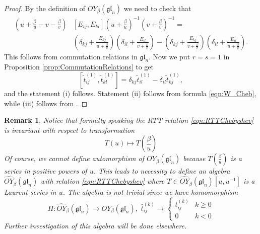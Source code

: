 \documentclass[10pt]{article}%
\numberwithin{equation}{section}
\newtheorem{rem}[thm]{Remark}
\newcommand{\gl}{{\mathfrak{gl}}}
\begin{document}
\begin{proof}
By the definition of $OY_{\beta}(\gl_n)$ we need to check that
    \[
\begin{aligned}
    \left(u+\frac{\beta}{u}-v-\frac{\beta}{v}\right)&[E_{ij},E_{kl}](u+\frac{\beta}{u})^{-1}(v+\frac{\beta}{v})^{-1}=\\
    &(\delta_{kj}+ \frac{E_{kj}}{u+\frac{\beta}{u}})(\delta_{il}+ \frac{E_{il}}{v+\frac{\beta}{v}})-(\delta_{kj}+ \frac{E_{kj}}{v+\frac{\beta}{v}})(\delta_{il}+ \frac{E_{il}}{u+\frac{\beta}{u}}).
\end{aligned}
\]
This follows from commutation relations in $\gl_n$. Now we put $r=s=1$  in Proposition \ref{prop:CommutationRelations} to get
\[
[\tilde{t}_{ij}^{(1)},\tilde{t}^{(1)}_{kl}]=\delta_{kj}\tilde{t}_{il}^{(1)}-\delta_{il} \tilde{t}_{kj}^{(1)},
\]
and the statement (i) follows. Statement (ii) follows from formula \eqref{eqn:W_Cheb}, while (iii) follows from  \cite[Proposition 1.3.1]{Molevbook}.



\end{proof}
\begin{rem}
    Notice that formally speaking the RTT relation \eqref{eqn:RTTChebyshev}  is invariant with respect to transformation
\[
T(u)\mapsto T(\frac{\beta}{u})
\]
Of course, we cannot define automorphism of $OY_{\beta}(\gl_n)$ because $T(\frac{\beta}{u})$ is a series in positive powers of $u$. This leads to necessity to define  an algebra $\widehat{OY}_{\beta}(\gl_n)$ with relation \eqref{eqn:RTTChebyshev} where $T\in \widehat{OY}_{\beta}(\gl_n)[u,u^{-1}]$ is a Laurent series in $u$. The algebra is not trivial since we have homomorphism
\[
H:\widehat{OY}_{\beta}(\gl_n)\to OY_{\beta}(\gl_n), \,\, \hat{t}_{ij}^{(k)}\to 
\left\{
\begin{array}{cc}
   t_{ij}^{(k)}  & k\geq 0 \\
    0 & k<0
\end{array}
\right.
\]
Further investigation of this algebra will be done elsewhere.
\end{rem}
\end{document}
